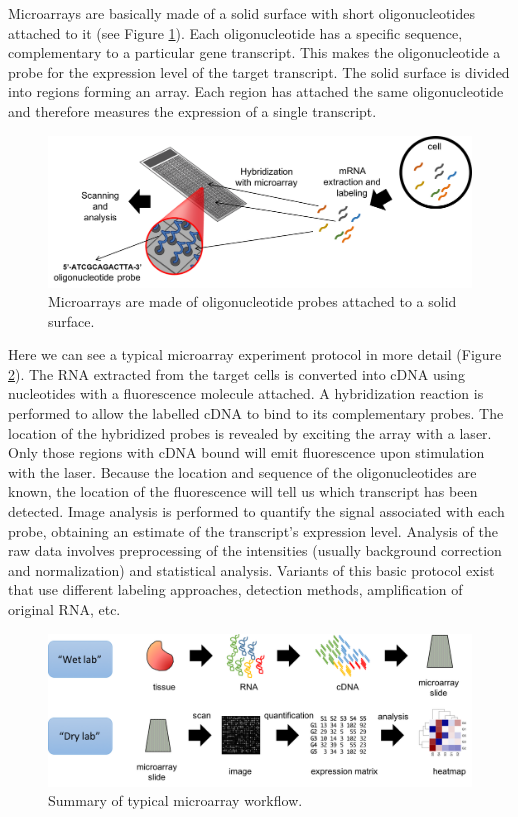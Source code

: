 \documentclass[]{book}
\theoremstyle{definition}
\theoremstyle{definition}
\theoremstyle{definition}
\theoremstyle{remark}
\begin{document}
Microarrays are basically made of a solid surface with short
oligonucleotides attached to it (see Figure \ref{fig:microarray}). Each
oligonucleotide has a specific sequence, complementary to a particular
gene transcript. This makes the oligonucleotide a probe for the
expression level of the target transcript. The solid surface is divided
into regions forming an array. Each region has attached the same
oligonucleotide and therefore measures the expression of a single
transcript.

\begin{figure}
\includegraphics[width=18.74in]{pic/microarray} \caption{Microarrays are made of oligonucleotide probes attached to a solid surface.}\label{fig:microarray}
\end{figure}

Here we can see a typical microarray experiment protocol in more detail
(Figure \ref{fig:microarray-workflow}). The RNA extracted from the
target cells is converted into cDNA using nucleotides with a
fluorescence molecule attached. A hybridization reaction is performed to
allow the labelled cDNA to bind to its complementary probes. The
location of the hybridized probes is revealed by exciting the array with
a laser. Only those regions with cDNA bound will emit fluorescence upon
stimulation with the laser. Because the location and sequence of the
oligonucleotides are known, the location of the fluorescence will tell
us which transcript has been detected. Image analysis is performed to
quantify the signal associated with each probe, obtaining an estimate of
the transcript's expression level. Analysis of the raw data involves
preprocessing of the intensities (usually background correction and
normalization) and statistical analysis. Variants of this basic protocol
exist that use different labeling approaches, detection methods,
amplification of original RNA, etc.

\begin{figure}
\includegraphics[width=20.07in]{pic/microarray_workflow} \caption{Summary of typical microarray workflow.}\label{fig:microarray-workflow}
\end{figure}
\end{document}

